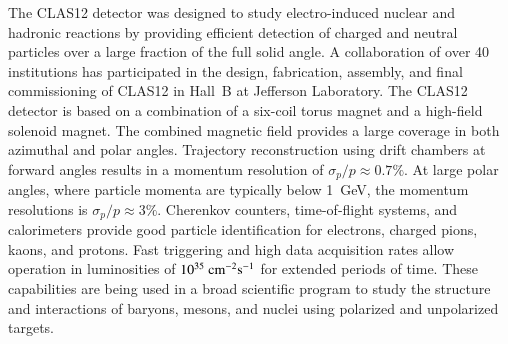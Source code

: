 \documentclass[final,3p,twocolumn]{elsarticle}
\begin{document}
The CLAS12 detector was designed to study electro-induced nuclear and hadronic reactions by providing efficient
detection of charged and neutral particles over a large fraction of the full solid angle. A collaboration of over 40
institutions has participated in the design, fabrication, assembly, and final commissioning of CLAS12 in Hall~B at 
Jefferson Laboratory. The CLAS12 detector is based on a combination of a six-coil torus magnet and a high-field
solenoid magnet. The combined magnetic field provides a large coverage in both azimuthal and polar angles.
Trajectory reconstruction using drift chambers at forward angles results in a momentum resolution of
${\sigma_p / p} \approx 0.7\%$. At large polar angles, where particle momenta are typically below 1~GeV, the 
momentum resolutions is $\sigma_p / p \approx 3\%$. Cherenkov counters, time-of-flight systems, and
calorimeters provide good particle identification for electrons, charged pions, kaons, and protons. Fast triggering
and high data acquisition rates allow operation in luminosities of $10^{35}~\rm{cm}^{-2}\rm{s}^{-1}$ for extended
periods of time. These capabilities are being used in a broad scientific program to study the structure and
interactions of baryons, mesons, and nuclei using polarized and unpolarized targets. 
\end{document}
